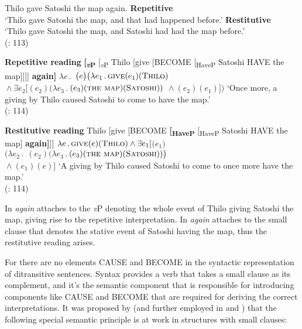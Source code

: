 \documentclass[output=paper]{langscibook}
\begin{document}
 \ea\label{ex:bondarenko:9}{Thilo gave Satoshi the map again.}
\ea \textbf{Repetitive}\\`Thilo gave Satoshi the map, and that had happened before.'
\ex \textbf{Restitutive}\\`Thilo gave Satoshi the map, and Satoshi had had the map before.'\\
\hfill(\citealt{Beck-Johnson2004}: 113)
\z
\z

\ea\label{ex:bondarenko:10}\textbf{Repetitive reading}
\ea \textbf{[\textit{\textsubscript{v}}}\textbf{\textsubscript{P}}\textsubscript{}  [\textit{\textsubscript{v}}\textsubscript{P} Thilo [give [BECOME [\textsubscript{HaveP} Satoshi HAVE the map]]]] \textbf{again]}
\ex $\lambda e\,.\;$$\,\big(e\big)\big(\lambda e_1\,.\,\textsc{give}(e_1)(\textsc{Thilo})$\\
\tabto{1cm}${}\wedge\exists e_2[$$(e_2)(\lambda e_3\,.\,$$(e_3)(\textsc{the map})(\textsc{Satoshi}))$
\tabto{1cm}${}\wedge{}$$(e_2)(e_1)]\big)$
\ex     `Once more, a giving by Thilo caused Satoshi to come to have   the map.'\\
\hfill(\citealt{Beck-Johnson2004}: 114)
\z
\z


 \ea\label{ex:bondarenko:11}\textbf{Restitutive reading}
\ea Thilo [give [BECOME \textbf{[\textsubscript{HaveP}} [\textsubscript{HaveP} Satoshi HAVE the map] \textbf{again]}]]
\ex $\lambda e\,.\,\textsc{give}(e)(\textsc{Thilo})\wedge\exists e_1[$$\big(e_1\big)$\\
\tabto{1cm}$\big(\lambda e_2\,.\;$$\,(e_2)(\lambda e_3\,.\,$$(e_3)(\textsc{the map})(\textsc{Satoshi}))\big)$\\
\tabto{1cm}${}\wedge{}$$(e_1)(e)]$
\ex     `A giving by Thilo caused Satoshi to come to once more have the   map.'\\
\hfill(\citealt{Beck-Johnson2004}: 114)
\z
\z

\noindent In  \textit{again} attaches to the \textit{v}P denoting the whole event of Thilo giving Satoshi the map, giving rise to the repetitive interpretation. In  \textit{again} attaches to the small clause that denotes the stative event of Satoshi having the map, thus the restitutive reading arises.



For \citet{Beck-Johnson2004} there are no elements CAUSE and BECOME in the syntactic representation of ditransitive sentences. Syntax provides a verb that takes a small clause as its complement, and it’s the semantic component that is responsible for introducing components like CAUSE and BECOME that are required for deriving the correct interpretations. It was proposed by \citet{vonStechow1995} (and further employed in \citealt{Beck-Johnson2004} and \citealt{Beck2005}) that the following special semantic principle is at work in structures with small clauses:
\end{document}
